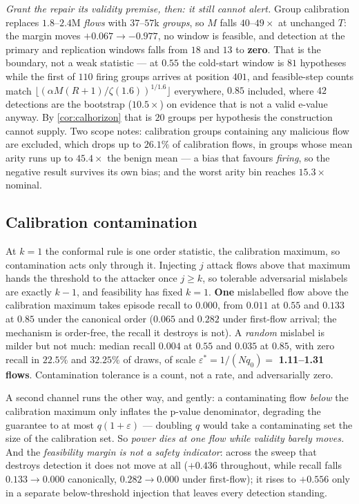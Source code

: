 \documentclass[conference]{IEEEtran}
\newcommand{\ceil}{M}
\begin{document}
\emph{Grant the repair its validity premise, then: it still cannot alert.} Group calibration replaces $1.8$--$2.4$M \emph{flows} with $37$--$57$k
\emph{groups}, so $\ceil$ falls $40$--$49\times$ at unchanged $T$: the margin moves $+0.067 \to
-0.977$, no window is feasible, and detection at the primary and replication windows falls from $18$ and $13$ to
\textbf{zero}. That is the boundary, not a weak statistic --- at $0.55$ the cold-start window is $81$
hypotheses while the first of $110$ firing groups arrives at position $401$, and feasible-step counts
match $\lfloor(\alpha\ceil(R{+}1)/\zeta(1.6))^{1/1.6}\rfloor$ everywhere, $0.85$ included, where $42$
detections are the bootstrap ($10.5\times$) on evidence that is not a valid e-value anyway. By
\cref{cor:calhorizon} that is $20$ groups per hypothesis the construction cannot supply. Two scope
notes: calibration groups containing any malicious flow are excluded, which drops up to $26.1\%$ of
calibration flows, in groups whose mean arity runs up to $45.4\times$ the benign mean --- a bias that
favours \emph{firing}, so the negative result survives its own bias; and the worst arity bin reaches
$15.3\times$ nominal.

\subsection{Calibration contamination}\label{sec:contamination}

At $k = 1$ the conformal rule is one order statistic, the calibration maximum, so contamination
acts only through it. Injecting $j$ attack flows above that maximum hands the threshold to the attacker
once $j \ge k$, so tolerable adversarial mislabels are exactly $k-1$, and feasibility has fixed
$k=1$. \textbf{One} mislabelled flow above the calibration maximum takes episode recall to
0.000, from $0.011$ at $0.55$ and $0.133$ at $0.85$ under the canonical order ($0.065$ and $0.282$
under first-flow arrival; the mechanism is order-free, the recall it destroys is not). A \emph{random}
mislabel is milder but not much: median recall $0.004$ at $0.55$ and $0.035$ at $0.85$, with zero
recall in $22.5\%$ and $32.25\%$ of draws, of scale $\varepsilon^{*} = 1/(N q_0) =$
\textbf{1.11--1.31 flows}. Contamination tolerance is a count, not a rate, and adversarially zero.

A second channel runs the other way, and gently: a contaminating flow \emph{below} the calibration
maximum only inflates the p-value denominator, degrading the guarantee to at most $q(1+\varepsilon)$ ---
doubling $q$ would take a contaminating set the size of the calibration set. So \emph{power dies at one
flow while validity barely moves.} And the \emph{feasibility margin is not a safety indicator}: across
the sweep that destroys detection it does not move at all ($+0.436$ throughout, while recall
falls $0.133\to0.000$ canonically, $0.282\to0.000$ under first-flow); it rises to $+0.556$ only in a
separate below-threshold injection that leaves every detection standing.
\end{document}
